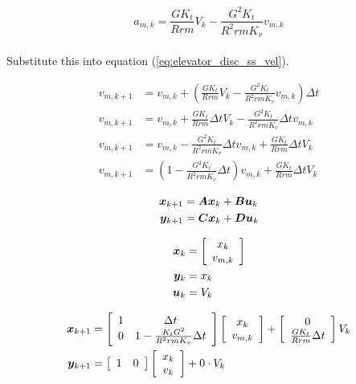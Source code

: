\begin{equation*}
  a_{m,k} = \frac{GK_t}{Rrm} V_k - \frac{G^2 K_t}{R^2 rm K_v} v_{m,k}
\end{equation*}
\\
Substitute this into equation (\ref{eq:elevator_disc_ss_vel}).

\begin{align}
  v_{m,k+1} &= v_{m,k} + \left(\frac{GK_t}{Rrm} V_k -
    \frac{G^2 K_t}{R^2 rm K_v} v_{m,k}\right) \Delta t \nonumber \\
  v_{m,k+1} &= v_{m,k} + \frac{GK_t}{Rrm} \Delta t V_k -
    \frac{G^2 K_t}{R^2 rm K_v} \Delta t v_{m,k} \nonumber \\
  v_{m,k+1} &= v_{m,k} - \frac{G^2 K_t}{R^2 rm K_v} \Delta t v_{m,k} +
    \frac{GK_t}{Rrm} \Delta t V_k \nonumber \\
  v_{m,k+1} &= \left(1 - \frac{G^2 K_t}{R^2 rm K_v} \Delta t\right) v_{m,k} +
    \frac{GK_t}{Rrm} \Delta t V_k
\end{align}

\begin{align*}
  \bm x_{k+1} &= \bm A \bm x_k + \bm B \bm u_k \\
  \bm y_{k+1} &= \bm C \bm x_k + \bm D \bm u_k
\end{align*}

\begin{align*}
  \bm x_k &= \left[
  \begin{array}{c}
    x_k \\
    v_{m,k}
  \end{array}
  \right] \\
  \bm y_k &= x_k \\
  \bm u_k &= V_k
\end{align*}

\begin{align}
  \bm x_{k+1} &= \left[
  \begin{array}{cc}
    1 & \Delta t \\
    0 & 1 - \frac{K_t G^2}{R^2rmK_v} \Delta t
  \end{array}
  \right] \left[
  \begin{array}{c}
    x_k \\
    v_{m,k} \\
  \end{array}
  \right] + \left[
  \begin{array}{c}
    0 \\
    \frac{GK_t}{Rrm} \Delta t
  \end{array}
  \right] V_k \\
  \bm y_{k+1} &= \left[
  \begin{array}{cc}
    1 & 0
  \end{array}
  \right] \left[
  \begin{array}{c}
    x_k \\
    v_k \\
  \end{array}
  \right] + 0 \cdot V_k
\end{align}
